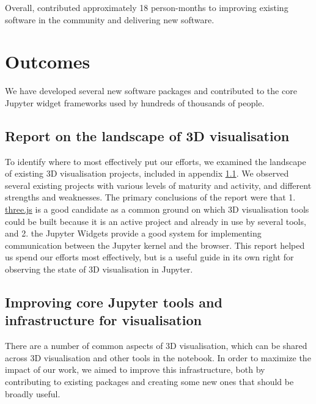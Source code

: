 \documentclass{deliverablereport}
\begin{document}

Overall, \ODK contributed approximately 18 person-months to improving existing software in the community and delivering new software.


\section{Outcomes}

We have developed several new software packages and contributed to the core Jupyter widget frameworks used by hundreds of thousands of people.

\subsection{Report on the landscape of 3D visualisation}\label{landscape}

To identify where to most effectively put our efforts,
we examined the landscape of existing 3D visualisation projects,
included in appendix \ref{landscape}.
We observed several existing projects with various levels of maturity and activity, and different strengths and weaknesses.
The primary conclusions of the report were that 1. \href{https://threejs.org}{three.js} is a good candidate as a common ground on which 3D visualisation tools could be built because it is an active project and already in use by several tools, and 2. the Jupyter Widgets provide a good system for implementing communication between the Jupyter kernel and the browser.
This report helped us spend our efforts most effectively,
but is a useful guide in its own right for observing the state
of 3D visualisation in Jupyter.


\subsection{Improving core Jupyter tools and infrastructure for visualisation}\label{improving-core}

There are a number of common aspects of 3D visualisation,
which can be shared across 3D visualisation and other tools
in the notebook.
In order to maximize the impact of our work,
we aimed to improve this infrastructure,
both by contributing to existing packages and creating some new ones
that should be broadly useful.
\end{document}
